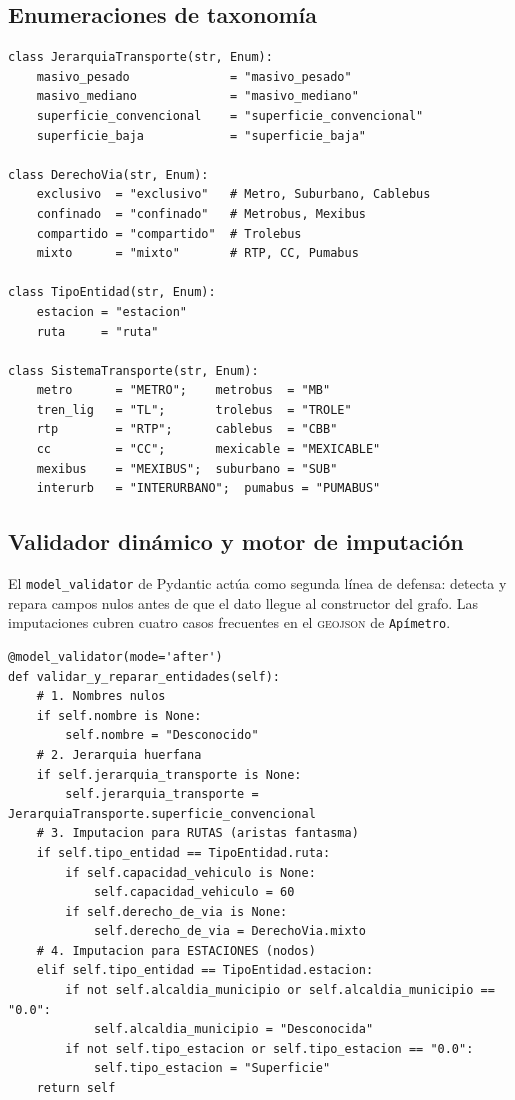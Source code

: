\subsection*{Enumeraciones de taxonomía}

\begin{lstlisting}[style=estiloPython,
    caption={Enumeraciones cerradas del contrato de datos VFTModel.
             \texttt{src/api/schemas/schemas.py}.},
    label=lst:vft-enums]
class JerarquiaTransporte(str, Enum):
    masivo_pesado              = "masivo_pesado"
    masivo_mediano             = "masivo_mediano"
    superficie_convencional    = "superficie_convencional"
    superficie_baja            = "superficie_baja"

class DerechoVia(str, Enum):
    exclusivo  = "exclusivo"   # Metro, Suburbano, Cablebus
    confinado  = "confinado"   # Metrobus, Mexibus
    compartido = "compartido"  # Trolebus
    mixto      = "mixto"       # RTP, CC, Pumabus

class TipoEntidad(str, Enum):
    estacion = "estacion"
    ruta     = "ruta"

class SistemaTransporte(str, Enum):
    metro      = "METRO";    metrobus  = "MB"
    tren_lig   = "TL";       trolebus  = "TROLE"
    rtp        = "RTP";      cablebus  = "CBB"
    cc         = "CC";       mexicable = "MEXICABLE"
    mexibus    = "MEXIBUS";  suburbano = "SUB"
    interurb   = "INTERURBANO";  pumabus = "PUMABUS"
\end{lstlisting}

\subsection*{Validador dinámico y motor de imputación}

El \texttt{model\_validator} de Pydantic actúa como segunda línea de defensa:
detecta y repara campos nulos antes de que el dato llegue al constructor del
grafo. Las imputaciones cubren cuatro casos frecuentes en el \textsc{geojson} de
\texttt{Apímetro}.

\begin{lstlisting}[style=estiloPython,
    caption={Validador dinámico que repara datos incompletos antes de construir el
             grafo. \texttt{src/api/schemas/schemas.py}.},
    label=lst:vft-validator]
@model_validator(mode='after')
def validar_y_reparar_entidades(self):
    # 1. Nombres nulos
    if self.nombre is None:
        self.nombre = "Desconocido"
    # 2. Jerarquia huerfana
    if self.jerarquia_transporte is None:
        self.jerarquia_transporte = JerarquiaTransporte.superficie_convencional
    # 3. Imputacion para RUTAS (aristas fantasma)
    if self.tipo_entidad == TipoEntidad.ruta:
        if self.capacidad_vehiculo is None:
            self.capacidad_vehiculo = 60
        if self.derecho_de_via is None:
            self.derecho_de_via = DerechoVia.mixto
    # 4. Imputacion para ESTACIONES (nodos)
    elif self.tipo_entidad == TipoEntidad.estacion:
        if not self.alcaldia_municipio or self.alcaldia_municipio == "0.0":
            self.alcaldia_municipio = "Desconocida"
        if not self.tipo_estacion or self.tipo_estacion == "0.0":
            self.tipo_estacion = "Superficie"
    return self
\end{lstlisting}
